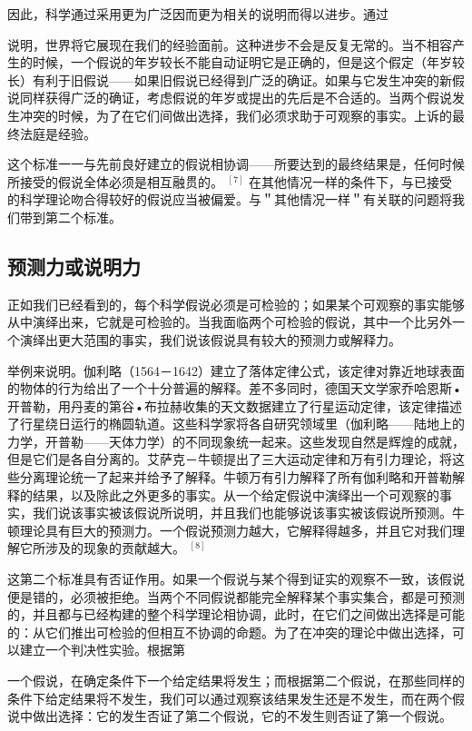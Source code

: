 因此，科学通过采用更为广泛因而更为相关的说明而得以进步。通过

说明，世界将它展现在我们的经验面前。这种进步不会是反复无常的。当不相容产生的时候，一个假说的年岁较长不能自动证明它是正确的，但是这个假定（年岁较长）有利于旧假说——如果旧假说已经得到广泛的确证。如果与它发生冲突的新假说同样获得广泛的确证，考虑假说的年岁或提出的先后是不合适的。当两个假说发生冲突的时候，为了在它们间做出选择，我们必须求助于可观察的事实。上诉的最终法庭是经验。

这个标准一一与先前良好建立的假说相协调——所要达到的最终结果是，任何时候所接受的假说全体必须是相互融贯的。 ${ }^{[7]}$ 在其他情况一样的条件下，与已接受的科学理论吻合得较好的假说应当被偏爱。与＂其他情况一样＂有关联的问题将我们带到第二个标准。

\subsection{预测力或说明力}
正如我们已经看到的，每个科学假说必须是可检验的；如果某个可观察的事实能够从中演绎出来，它就是可检验的。当我面临两个可检验的假说，其中一个比另外一个演绎出更大范围的事实，我们说该假说具有较大的预测力或解释力。

举例来说明。伽利略（1564－1642）建立了落体定律公式，该定律对靠近地球表面的物体的行为给出了一个十分普遍的解释。差不多同时，德国天文学家乔哈恩斯•开普勒，用丹麦的第谷•布拉赫收集的天文数据建立了行星运动定律，该定律描述了行星绕日运行的椭圆轨道。这些科学家将各自研究领域里（伽利略——陆地上的力学，开普勒——天体力学）的不同现象统一起来。这些发现自然是辉煌的成就，但是它们是各自分离的。艾萨克－牛顿提出了三大运动定律和万有引力理论，将这些分离理论统一了起来并给予了解释。牛顿万有引力解释了所有伽利略和开普勒解释的结果，以及除此之外更多的事实。从一个给定假说中演绎出一个可观察的事实，我们说该事实被该假说所说明，并且我们也能够说该事实被该假说所预测。牛顿理论具有巨大的预测力。一个假说预测力越大，它解释得越多，并且它对我们理解它所涉及的现象的贡献越大。 ${ }^{[8]}$

这第二个标准具有否证作用。如果一个假说与某个得到证实的观察不一致，该假说便是错的，必须被拒绝。当两个不同假说都能完全解释某个事实集合，都是可预测的，并且都与已经构建的整个科学理论相协调，此时，在它们之间做出选择是可能的：从它们推出可检验的但相互不协调的命题。为了在冲突的理论中做出选择，可以建立一个判决性实验。根据第

一个假说，在确定条件下一个给定结果将发生；而根据第二个假说，在那些同样的条件下给定结果将不发生，我们可以通过观察该结果发生还是不发生，而在两个假说中做出选择：它的发生否证了第二个假说，它的不发生则否证了第一个假说。

